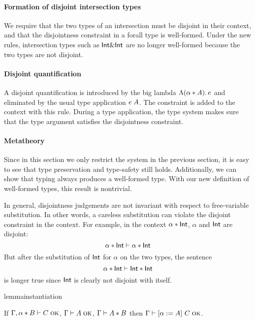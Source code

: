 \paragraph{Formation of disjoint intersection types}

We require that the two types of an intersection must be disjoint in their
context, and that the disjointness constraint in a forall type is well-formed.
Under the new rules, intersection types such as $\textsf{Int} \& \textsf{Int}$ are no
longer well-formed because the two types are not disjoint.

\paragraph{Disjoint quantification} A disjoint quantification is introduced by
the big lambda $\Lambda (\alpha * A).\, e$ and eliminated by the usual type
application $e \; A$. The constraint is added to the context with this rule.
During a type application, the type system makes sure that the type argument
satisfies the disjointness constraint.

\paragraph{Metatheory} Since in this section we only restrict the system in the
previous section, it is easy to see that type preservation and type-safety still
holds. Additionally, we can show that typing always produces a well-formed type.
With our new definition of well-formed types, this result is nontrivial.

In general, disjointness judgements are not invariant with respect to
free-variable substitution. In other words, a careless substitution can violate
the disjoint constraint in the context. For example, in the context $\alpha
* \textsf{Int}$, $\alpha$ and $\textsf{Int}$ are disjoint:
\[ \alpha * \textsf{Int} \vdash \alpha * \textsf{Int} \]
But after the substitution of $\textsf{Int}$ for $\alpha$ on the two types, the sentence
\[ \alpha * \textsf{Int} \vdash \textsf{Int} * \textsf{Int} \]
is longer true since $\textsf{Int}$ is clearly not disjoint with itself.

\begin{restatable}[Instantiation]{lemma}{instantiation}
  \label{lemma:instantiation}

  If $\Gamma, \alpha * B \vdash C \; \textsc{ok}$, $\Gamma \vdash A \; \textsc{ok}$, $\Gamma \vdash A * B$
  then $\Gamma \vdash \lbrack \alpha := A \rbrack~ C \; \textsc{ok}$.
\end{restatable}

